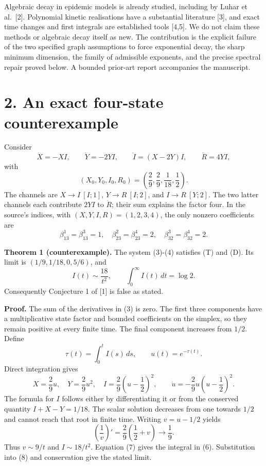 \documentclass[
  11pt,
  a4paper,
]{scrartcl}
\begin{document}
Algebraic decay in epidemic models is already studied, including by
Luhar et al.~{[}2{]}. Polynomial kinetic realisations have a substantial
literature {[}3{]}, and exact time changes and first integrals are
established tools {[}4,5{]}. We do not claim these methods or algebraic
decay itself as new. The contribution is the explicit failure of the two
specified graph assumptions to force exponential decay, the sharp
minimum dimension, the family of admissible exponents, and the precise
spectral repair proved below. A bounded prior-art report accompanies the
manuscript.

\section{2. An exact four-state
counterexample}\label{an-exact-four-state-counterexample}

Consider \[
\dot X=-XI,\qquad \dot Y=-2YI,\qquad
\dot I=(X-2Y)I,\qquad \dot R=4YI,
\tag{3}
\] with \[
(X_0,Y_0,I_0,R_0)=\left(\frac29,\frac29,\frac1{18},\frac12\right).
\tag{4}
\] The channels are \(X\to I\ [I;1]\), \(Y\to R\ [I;2]\), and
\(I\to R\ [Y;2]\). The two latter channels each contribute \(2YI\) to
\(\dot R\); their sum explains the factor four. In the source's indices,
with \((X,Y,I,R)=(1,2,3,4)\), the only nonzero coefficients are \[
\beta^1_{13}=\beta^3_{13}=1,\quad
\beta^2_{23}=\beta^4_{23}=2,\quad
\beta^3_{32}=\beta^4_{32}=2.
\tag{5}
\]

\textbf{Theorem 1 (counterexample).} The system (3)-(4) satisfies (T)
and (D). Its limit is \((1/9,1/18,0,5/6)\), and \[
I(t)\sim\frac{18}{t^2},\qquad
\int_0^\infty I(t)\,dt=\log2.
\tag{6}
\] Consequently Conjecture 1 of {[}1{]} is false as stated.

\textbf{Proof.} The sum of the derivatives in (3) is zero. The first
three components have a multiplicative state factor and bounded
coefficients on the simplex, so they remain positive at every finite
time. The final component increases from \(1/2\). Define \[
\tau(t)=\int_0^t I(s)\,ds,\qquad u(t)=e^{-\tau(t)}.
\tag{7}
\] Direct integration gives \[
X=\frac29u,\quad Y=\frac29u^2,\quad
I=\frac29\left(u-\frac12\right)^2,
\qquad
\dot u=-\frac29u\left(u-\frac12\right)^2.
\tag{8}
\] The formula for \(I\) follows either by differentiating it or from
the conserved quantity \(I+X-Y=1/18\). The scalar solution decreases
from one towards \(1/2\) and cannot reach that root in finite time.
Writing \(v=u-1/2\) yields \[
\left(\frac1v\right)'=\frac29\left(\frac12+v\right)\longrightarrow\frac19.
\] Thus \(v\sim9/t\) and \(I\sim18/t^2\). Equation (7) gives the
integral in (6). Substitution into (8) and conservation give the stated
limit.
\end{document}
